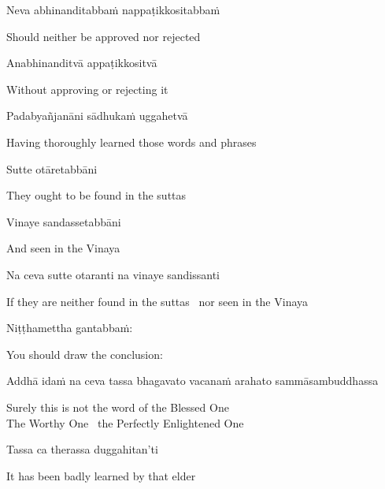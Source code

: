 Neva abhinanditabbaṁ nappaṭikkositabbaṁ

\begin{english}
  Should neither be approved nor rejected
\end{english}

Anabhinanditvā appaṭikkositvā

\begin{english}
  Without approving or rejecting it
\end{english}

Padabyañjanāni sādhukaṁ uggahetvā

\begin{english}
  Having thoroughly learned those words and phrases
\end{english}

Sutte otāretabbāni

\begin{english}
  They ought to be found in the suttas
\end{english}

Vinaye sandassetabbāni

\begin{english}
  And seen in the Vinaya
\end{english}

Na ceva sutte otaranti na vinaye sandissanti

\begin{english}
  If they are neither found in the suttas \breathmark\ nor seen in the Vinaya
\end{english}

Niṭṭhamettha gantabbaṁ:

\begin{english}
  You should draw the conclusion:
\end{english}

\begin{pali-hang}
  Addhā idaṁ na ceva tassa bhagavato vacanaṁ arahato sammāsambuddhassa
\end{pali-hang}

\begin{english}
  Surely this is not the word of the Blessed One\\
  The Worthy One \breathmark\ the Perfectly Enlightened One
\end{english}

Tassa ca therassa duggahitan'ti

\begin{english}
  It has been badly learned by that elder
\end{english}


